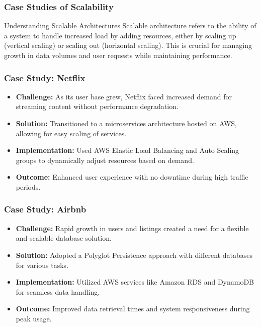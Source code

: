 \documentclass[aspectratio=169]{beamer}
\begin{document}
\begin{frame}[fragile]
    \frametitle{Case Studies of Scalability}
    \begin{block}{Understanding Scalable Architectures}
        Scalable architecture refers to the ability of a system to handle increased load by adding resources, either by scaling up (vertical scaling) or scaling out (horizontal scaling).
        This is crucial for managing growth in data volumes and user requests while maintaining performance.
    \end{block}
\end{frame}

\begin{frame}[fragile]
    \frametitle{Case Study: Netflix}
    \begin{itemize}
        \item \textbf{Challenge:} As its user base grew, Netflix faced increased demand for streaming content without performance degradation.
        \item \textbf{Solution:} Transitioned to a microservices architecture hosted on AWS, allowing for easy scaling of services.
        \item \textbf{Implementation:} Used AWS Elastic Load Balancing and Auto Scaling groups to dynamically adjust resources based on demand.
        \item \textbf{Outcome:} Enhanced user experience with no downtime during high traffic periods.
    \end{itemize}
\end{frame}

\begin{frame}[fragile]
    \frametitle{Case Study: Airbnb}
    \begin{itemize}
        \item \textbf{Challenge:} Rapid growth in users and listings created a need for a flexible and scalable database solution.
        \item \textbf{Solution:} Adopted a Polyglot Persistence approach with different databases for various tasks.
        \item \textbf{Implementation:} Utilized AWS services like Amazon RDS and DynamoDB for seamless data handling.
        \item \textbf{Outcome:} Improved data retrieval times and system responsiveness during peak usage.
    \end{itemize}
\end{frame}
\end{document}
